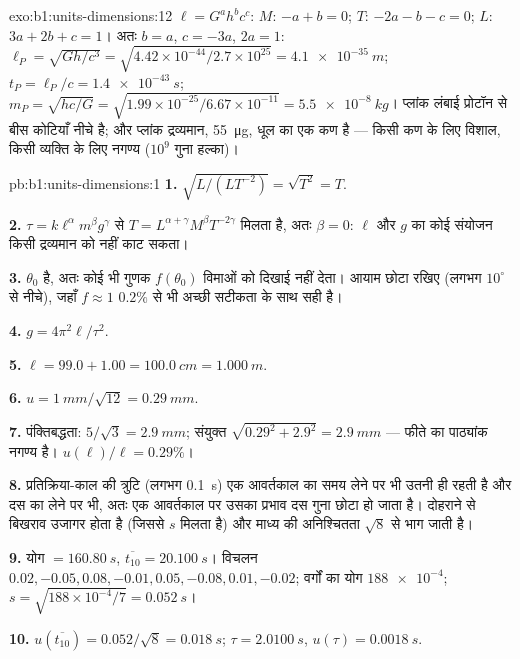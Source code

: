 \begin{solution}{exo:b1:units-dimensions:12}
$\ell = G^a h^b c^c$: $M$: $-a + b = 0$; $T$: $-2a - b - c = 0$; $L$:
$3a + 2b + c = 1$। अतः $b = a$, $c = -3a$, $2a = 1$:
$\ell_P = \sqrt{Gh/c^3} = \sqrt{4.42\times10^{-44}/2.7\times10^{25}}
= \qty{4.1e-35}{m}$; $t_P = \ell_P/c = \qty{1.4e-43}{s}$;
$m_P = \sqrt{hc/G} = \sqrt{1.99\times10^{-25}/6.67\times10^{-11}}
= \qty{5.5e-8}{kg}$। प्लांक लंबाई प्रोटॉन से बीस कोटियाँ नीचे है; और प्लांक
द्रव्यमान, \qty{55}{\micro g}, धूल का एक कण है --- किसी कण के लिए विशाल, किसी
व्यक्ति के लिए नगण्य ($10^9$ गुना हल्का)।
\end{solution}

\begin{solution}{pb:b1:units-dimensions:1}
\textbf{1.} $\sqrt{L/(L T^{-2})} = \sqrt{T^2} = T$.

\textbf{2.} $\tau = k\ell^\alpha m^\beta g^\gamma$ से
$T = L^{\alpha+\gamma} M^\beta T^{-2\gamma}$ मिलता है, अतः $\beta = 0$:
$\ell$ और $g$ का कोई संयोजन किसी द्रव्यमान को नहीं काट सकता।

\textbf{3.} $\theta_0$  है, अतः कोई भी गुणक $f(\theta_0)$ विमाओं को
दिखाई नहीं देता। आयाम छोटा रखिए (लगभग $10^\circ$ से नीचे), जहाँ $f \approx 1$
$0.2\%$ से भी अच्छी सटीकता के साथ सही है।

\textbf{4.} $g = 4\pi^2\ell/\tau^2$.

\textbf{5.} $\ell = 99.0 + 1.00 = \qty{100.0}{cm} = \qty{1.000}{m}$.

\textbf{6.} $u = \qty{1}{mm}/\sqrt{12} = \qty{0.29}{mm}$.

\textbf{7.} पंक्तिबद्धता: $5/\sqrt3 = \qty{2.9}{mm}$; संयुक्त
$\sqrt{0.29^2 + 2.9^2} = \qty{2.9}{mm}$ --- फीते का पाठ्यांक नगण्य है।
$u(\ell)/\ell = 0.29\%$।

\textbf{8.} प्रतिक्रिया-काल की त्रुटि (लगभग \qty{0.1}{s}) एक आवर्तकाल का समय
लेने पर भी उतनी ही रहती है और दस का लेने पर भी, अतः एक आवर्तकाल पर उसका प्रभाव
दस गुना छोटा हो जाता है। दोहराने से बिखराव उजागर होता है (जिससे $s$ मिलता है)
और माध्य की अनिश्चितता $\sqrt8$ से भाग जाती है।

\textbf{9.} योग $= \qty{160.80}{s}$, $\overline{t_{10}} = \qty{20.100}{s}$।
विचलन $0.02, -0.05, 0.08, -0.01, 0.05, -0.08, 0.01, -0.02$; वर्गों का योग
$\num{188e-4}$; $s = \sqrt{188\times10^{-4}/7} = \qty{0.052}{s}$।

\textbf{10.} $u(\overline{t_{10}}) = 0.052/\sqrt8 = \qty{0.018}{s}$;
$\tau = \qty{2.0100}{s}$, $u(\tau) = \qty{0.0018}{s}$.


\end{solution}
